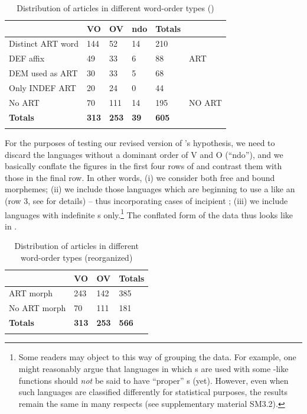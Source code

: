 \documentclass[output=paper]{langsci/langscibook}
\begin{document}
\begin{table}
\begin{tabularx}{.8\textwidth}{lYYYYl}
\lsptoprule
& VO &  OV &  ndo &  Totals\\
\midrule
Distinct ART word & 144 & 52 & 14 & 210 & \\
DEF affix & 49 & 33 & 6 & 88 & ART\\
DEM used as ART & 30 & 33 & 5 & 68 & \\
Only INDEF ART & 20 & 24 & 0 & 44 & \\
\midrule
No ART & 70 & 111 & 14 & 195 & NO ART\\
\midrule
\textbf{Totals} & \textbf{313} & \textbf{253} & \textbf{39} & \textbf{605} & \\
\lspbottomrule
\end{tabularx}
\caption{Distribution of articles in different word-order types (\citealt{Dryer2013_Def,Dryer2013_OV})}
\label{tab:ksb:1}
\end{table} 

For the purposes of testing our revised version of ’s hypothesis, we need to discard the languages without a dominant order of V and O (“ndo”), and we basically conflate the figures in the first four rows of  and contrast them with those in the final row. In other words, (i) we consider both free and bound  morphemes; (ii) we include those languages which are beginning to use a  like an  (row 3, see \citealt{Dryer2013_Def} for details) – thus incorporating cases of incipient ; (iii) we include languages with indefinite s only.\footnote{Some readers may object to this way of grouping the data. For example, one might reasonably argue that languages in which s are used with some -like functions should \textit{not} be said to have “proper” s (yet). However, even when such languages are classified differently for statistical purposes, the results remain the same in many respects (see supplementary material SM3.2).} The conflated form of the data thus looks like in .

\begin{table} 

\begin{tabularx}{.8\textwidth}{lYYY}
\lsptoprule
& VO  & OV & Totals\\
\midrule
ART morph & 243 & 142 & 385\\
No ART morph & 70 & 111 & 181\\
\midrule 
\textbf{Totals} & \textbf{313} & \textbf{253} & \textbf{566}\\
\lspbottomrule
\end{tabularx} 
\caption{Distribution of articles in different word-order types (reorganized)}
\label{tab:ksb:2}
\end{table} 
\end{document}
